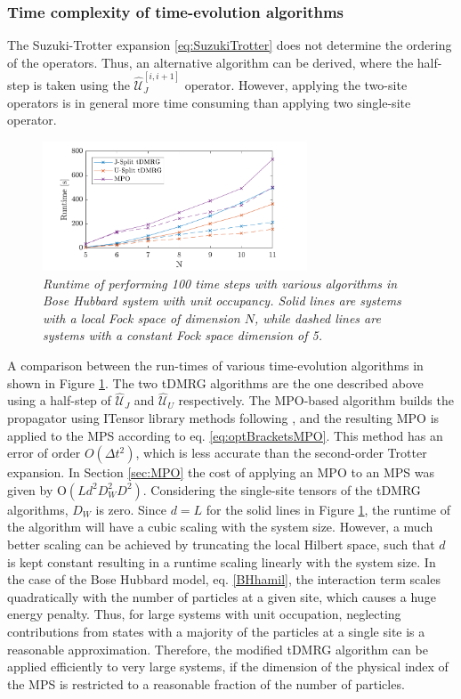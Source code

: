\subsubsection{Time complexity of time-evolution algorithms}
The Suzuki-Trotter expansion \eqref{eq:SuzukiTrotter} does not determine the ordering of the operators. Thus, an alternative algorithm can be derived, where the half-step is taken using the $\hat{\mathcal{U}}_{J}^{[i,i+1]}$ operator. However, applying the two-site operators is in general more time consuming than applying two single-site operator.
\begin{figure}[h!]
    \centering
    \includegraphics[width=0.7\textwidth]{Figures/CompareRuntime.pdf}
    \caption{\textit{Runtime of performing 100 time steps with various algorithms in Bose Hubbard system with unit occupancy. Solid lines are systems with a local Fock space of dimension $N$, while dashed lines are systems with a constant Fock space dimension of 5.}}
    \label{fig:CompareRuntime}
\end{figure}
A comparison between the run-times of various time-evolution algorithms in shown in Figure \ref{fig:CompareRuntime}. The two tDMRG algorithms are the one described above using a half-step of $\hat{\mathcal{U}}_{J}$ and $\hat{\mathcal{U}}_{U}$ respectively. The MPO-based algorithm builds the propagator using ITensor library methods following \cite{Pollmann2015}, and the resulting MPO is applied to the MPS according to eq. \eqref{eq:optBracketsMPO}. This method has an error of order $O(\Delta t ^2)$, which is less accurate than the second-order Trotter expansion.
In Section \ref{sec:MPO} the cost of applying an MPO to an MPS was given by $\mathrm{O}(L d^2 D_W ^2 D^2)$. Considering the single-site tensors of the tDMRG algorithms, $D_W$ is zero. Since $d = L$ for the solid lines in Figure \ref{fig:CompareRuntime}, the runtime of the algorithm will have a cubic scaling with the system size. However, a much better scaling can be achieved by truncating the local Hilbert space, such that $d$ is kept constant resulting in a runtime scaling linearly with the system size.
In the case of the Bose Hubbard model, eq. \eqref{BHhamil}, the interaction term scales quadratically with the number of particles at a given site, which causes a huge energy penalty. Thus, for large systems with unit occupation, neglecting contributions from states with a majority of the particles at a single site is a reasonable approximation.
Therefore, the modified tDMRG algorithm can be applied efficiently to very large systems, if the dimension of the physical index of the MPS is restricted to a reasonable fraction of the number of particles.   